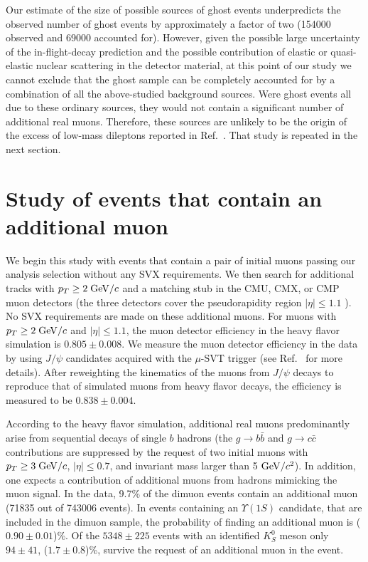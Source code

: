 \documentclass[aps,prd,preprint,floatfix,nofootinbib,superscriptaddress,showpacs,amssymb]{revtex4}
\begin{document}
 Our estimate  of the size of possible sources of ghost events 
 underpredicts the observed number of ghost events by approximately a 
 factor of two (154000 observed and 69000 accounted for).
 However, given the possible large uncertainty of the
 in-flight-decay prediction and the possible contribution of elastic
 or quasi-elastic nuclear scattering in the detector material, at this
 point of our study we cannot exclude that the ghost sample can 
 be completely accounted for by a combination of all the above-studied 
 background sources. Were ghost events all due to these ordinary 
 sources, they would not contain a significant number of additional
 real muons. Therefore, these sources are unlikely to be the origin of the
 excess of low-mass dileptons reported in Ref.~\cite{dilb}. That study is
 repeated in the next section.
 \section{Study of events that contain an additional muon}
 \label{sec:ss-3mu}
 We begin this study with events that contain a pair of initial muons 
 passing our analysis selection  without any SVX requirements.
 We then search for additional tracks with  $p_T \geq 2 \; {\rm GeV/}c$ and a
 matching stub in the CMU, CMX, or CMP muon detectors (the three detectors
 cover the pseudorapidity region $|\eta| \leq 1.1$ ). No SVX requirements
 are made on these additional muons. For muons with $p_T \geq 2 \; {\rm GeV/}c$
 and $|\eta| \leq 1.1$, the muon detector efficiency in the heavy flavor 
 simulation is $0.805 \pm 0.008$. We measure the muon detector efficiency
 in the data by using $J/\psi$ candidates acquired with the $\mu$-SVT trigger
 (see  Ref.~\cite{bbxs} for more details). After reweighting the kinematics
 of the muons from $J/\psi$ decays to reproduce that of simulated muons from 
 heavy flavor decays, the efficiency is measured to be $0.838 \pm 0.004$.

 According to the heavy flavor simulation, additional real muons predominantly 
 arise from sequential decays of single $b$ hadrons
 (the $g \rightarrow b \bar{b}$ and $g \rightarrow c \bar{c}$ contributions
 are suppressed by the request of two initial muons with $p_T \geq 3\; {\rm GeV/}c$,
 $|\eta| \leq 0.7$, and invariant mass larger than 5 ${\rm GeV/}c^2$). In addition,
 one expects a contribution of additional muons from hadrons mimicking
 the muon signal. In the data, 9.7\% of the dimuon events contain an
 additional muon (71835 out of 743006 events). In events containing an
 $\Upsilon(1S)$ candidate, that are included in the dimuon sample, the
 probability of finding an additional muon is ($0.90 \pm 0.01$)\%.
 Of the $5348 \pm 225$ events with an identified $K^0_S$
 meson only $94 \pm 41$,  ($1.7 \pm0.8$)\%, survive the request of an additional muon in 
 the event. 
\end{document}
